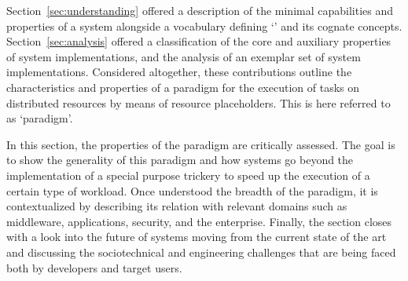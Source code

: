 \documentclass{sig-alternate}
\begin{document}


Section~\ref{sec:understanding} offered a description of the minimal
capabilities and properties of a \pilot system alongside a vocabulary defining
`\pilot' and its cognate concepts. Section~\ref{sec:analysis} offered a
classification of the core and auxiliary properties of \pilot system
implementations, and the analysis of an exemplar set of \pilot system
implementations. Considered altogether, these contributions outline the
characteristics and properties of a paradigm for the execution of tasks on
distributed resources by means of resource placeholders. This is here referred
to as `\pilot paradigm'.

In this section, the properties of the \pilot paradigm are critically assessed.
The goal is to show the generality of this paradigm and how \pilot systems go
beyond the implementation of a special purpose trickery to speed up the
execution of a certain type of workload. Once understood the breadth of the
\pilot paradigm, it is contextualized by describing its relation with relevant
domains such as middleware, applications, security, and the enterprise.
Finally, the section closes with a look into the future of \pilot systems
moving from the current state of the art and discussing the sociotechnical and
engineering challenges that are being faced both by developers and target
users.

\end{document}
